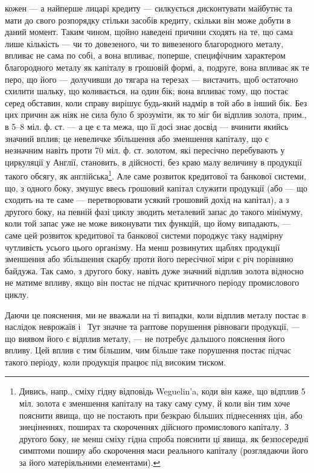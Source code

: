 \parcont{}  %
кожен — а найперше лицарі кредиту — силкується дисконтувати майбутнє та
мати до свого розпорядку стільки засобів кредиту, скільки він може добути в
даний момент. Таким чином, щойно наведені причини сходять на те, що сама
лише кількість — чи то довезеного, чи то вивезеного благородного металу, впливає
не сама по собі, а вона впливає, поперше, специфічним характером благородного
металу як капіталу в грошовій формі, а, подруге, вона впливає як те перо,
що його — долучивши до тягара на терезах — вистачить, щоб остаточно схилити
шальку, що коливається, на один бік; вона впливає тому, що постає серед
обставин, коли справу вирішує будь-який надмір в той або в інший бік. Без цих
причин аж ніяк не сила було б зрозуміти, як то міг би відплив золота, прим.,
в 5--8 міл. ф. ст. — а це є та межа, що її досі знає досвід — вчинити якийсь
значний вплив; це невеличке збільшення або зменшення капіталу, що є незначним
навіть проти 70 міл. ф. ст. золотом, які пересічно перебувають у циркуляції
у Англії, становить, в дійсності, без краю малу величину в продукції такого
обсягу, як англійська\footnote{
Дивись, напр., сміху гідну відповідь Weguelin’a, коди він каже, що відплив 5 міл. золота
є зменшення капіталу на таку саму суму, й коли він тим хоче пояснити явища, що не постають при
безкраю
більших піднесеннях цін, або знеціненнях, поширах та скороченнях дійсного промислового капіталу.
З другого боку, не менш сміху гідна спроба пояснити ці явища, як безпосередні симптоми поширу або
скорочення маси реального капіталу (розглядаючи його за його матеріяльними елементами).
}. Але саме розвиток кредитової та банкової системи, що,
з одного боку, змушує ввесь грошовий капітал служити продукції (або — що
сходить на те саме — перетворювати усякий грошовий дохід на капітал), а з
другого боку, на певній фазі циклу зводить металевий запас до такого мінімуму,
коли той запас уже не може виконувати тих функцій, що йому випадають, —
саме цей розвиток кредитової та банкової системи породжує таку надмірну чутливість
усього цього організму. На менш розвинутих щаблях продукції зменшення
або збільшення скарбу проти його пересічної міри є річ порівняно байдужа.
Так само, з другого боку, навіть дуже значний відплив золота відносно
не матиме впливу, якщо він постає не підчас критичного періоду промислового
циклу.

Даючи це пояснення, ми не вважали на ті випадки, коли відплив металу
постає в наслідок неврожаїв і~ Тут значне та раптове порушення рівноваги
продукції, — що виявом його є відплив металу, — не потребує дальшого пояснення
його впливу. Цей вплив є тим більшим, чим більше таке порушення постає
підчас такого періоду, коли продукція працює під високим тиском.


